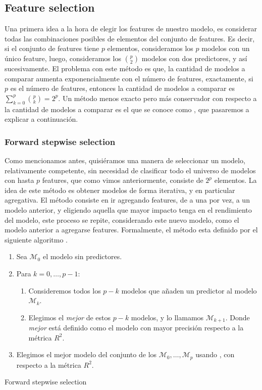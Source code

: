 \subsection{Feature selection}
    Una primera idea a la hora de elegir los features de nuestro modelo, es considerar todas las combinaciones posibles de elementos del conjunto de features. Es decir, si el conjunto de features tiene $p$ elementos, consideramos los $p$ modelos con un único feature, luego, consideramos los $\binom{p}{2}$ modelos con dos predictores, y así sucesivamente. El problema con este método es que, la cantidad de modelos a comparar aumenta exponencialmente con el número de features, exactamente, si $p$ es el número de features, entonces  la cantidad de modelos a comparar es $\sum_{k=0}^{p}\binom{p}{k} = 2^p$. Un método menos exacto pero más conservador con respecto a la cantidad de modelos a comparar es el que se conoce como \fss, que pasaremos a explicar a continuación.

\subsubsection{Forward stepwise selection}
    Como mencionamos antes, quisiéramos una manera de seleccionar un modelo, relativamente competente, sin necesidad de clasificar todo el universo de modelos con hasta $p$ features, que como vimos anteriormente, consiste de $2^p$ elementos. La idea de este método es obtener modelos de forma iterativa, y en particular agregativa. El método consiste en ir agregando features, de a una por vez, a un modelo anterior, y eligiendo aquella que mayor impacto tenga en el rendimiento del modelo, este proceso se repite, considerando este nuevo modelo, como el modelo anterior a agregarse features. Formalmente, el método esta definido por el siguiente algoritmo \cite{islr}.
    
    
    \begin{algorithm}[H]
    \begin{enumerate}
        \item Sea $\mathcal{M}_0$ el modelo sin predictores.
        \item Para $k=0, \dots ,p-1$:
        \begin{enumerate}
            \item Consideremos todos los $p-k$ modelos que añaden un predictor al modelo $\mathcal{M}_k$.
            \item Elegimos el \emph{mejor} de estos $p-k$ modelos, y lo llamamos $\mathcal{M}_{k+1}$. Donde \emph{mejor} está definido como el modelo con mayor precisión respecto a la métrica $R^2$.
        \end{enumerate}
        \item Elegimos el mejor modelo del conjunto de los $\mathcal{M}_0,\dots,\mathcal{M}_p$ usando \cv, con respecto a la métrica $R^2$.
    \end{enumerate}
         \caption{Forward stepwise selection}
    \end{algorithm}

